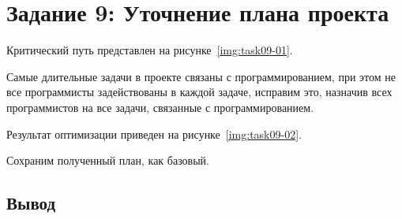 \section{Задание 9: Уточнение плана проекта}

Критический путь представлен на рисунке~\ref{img:task09-01}.


Самые длительные задачи в проекте связаны с программированием, при этом не все
программисты задействованы в каждой задаче, исправим это, назначив всех
программистов на все задачи, связанные с программированием.

Результат оптимизации приведен на рисунке~\ref{img:task09-02}.


Сохраним полученный план, как базовый.

\subsection*{Вывод}

